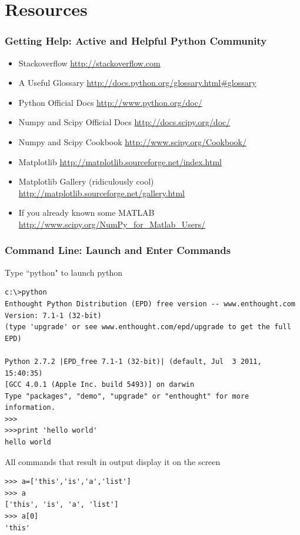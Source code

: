 \documentclass{beamer}
\begin{document}
\section {Resources}
\begin{frame}[fragile]
\frametitle{Getting Help: Active and Helpful Python Community}
\begin{itemize}
\item Stackoverflow \url{http://stackoverflow.com}
\pause
\item A Useful Glossary \url{http://docs.python.org/glossary.html#glossary}
\pause
\item Python Official Docs \url{http://www.python.org/doc/}
\item Numpy and Scipy Official Docs \url{http://docs.scipy.org/doc/}
\pause
\item Numpy and Scipy Cookbook \url{http://www.scipy.org/Cookbook/}
\pause
\item Matplotlib \url{http://matplotlib.sourceforge.net/index.html}
\item Matplotlib Gallery (ridiculously cool) \url{http://matplotlib.sourceforge.net/gallery.html}
\pause
\item If you already known some MATLAB \url{http://www.scipy.org/NumPy_for_Matlab_Users/}
\end{itemize}
\end{frame}

\begin{frame}[fragile]
\frametitle{Command Line: Launch and Enter Commands}

Type ``python" to launch python
\begin{lstlisting}
c:\>python
Enthought Python Distribution (EPD) free version -- www.enthought.com
Version: 7.1-1 (32-bit)
(type 'upgrade' or see www.enthought.com/epd/upgrade to get the full EPD)

Python 2.7.2 |EPD_free 7.1-1 (32-bit)| (default, Jul  3 2011, 15:40:35) 
[GCC 4.0.1 (Apple Inc. build 5493)] on darwin
Type "packages", "demo", "upgrade" or "enthought" for more information.
>>>
>>>print 'hello world'
hello world
\end{lstlisting}
\pause
All commands that result in output display it on the screen
\begin{lstlisting}
>>> a=['this','is','a','list']
>>> a
['this', 'is', 'a', 'list']
>>> a[0]
'this'
\end{lstlisting}

\end{frame}
\end{document}
